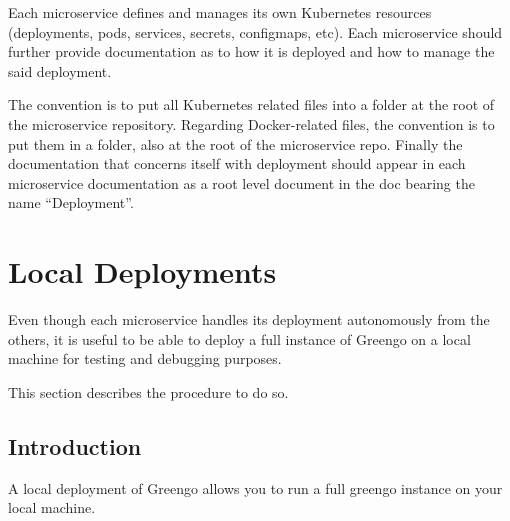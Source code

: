 \documentclass[letterpaper,10pt,english]{sphinxmanual}
\begin{document}
Each microservice defines and manages its own Kubernetes resources (deployments, pods, services, secrets, configmaps, etc).
Each microservice should further provide documentation as to how it is deployed and how to manage the said deployment.

The convention is to put all Kubernetes related files into a  folder at the root of the microservice repository.
Regarding Docker-related files, the convention is to put them in a  folder, also at the root of the microservice repo.
Finally the documentation that concerns itself with deployment should appear in each microservice documentation as a root level document in the doc bearing the name “Deployment”.


\section{Local Deployments}
\label{\detokenize{deployments:local-deployments}}
Even though each microservice handles its deployment autonomously from the others, it is useful to be able to deploy a full instance of Greengo on a local machine for testing and debugging purposes.

This section describes the procedure to do so.


\subsection{Introduction}
\label{\detokenize{deployments:introduction}}
A local deployment of Greengo allows you to run a full greengo instance on your local machine.
\end{document}
